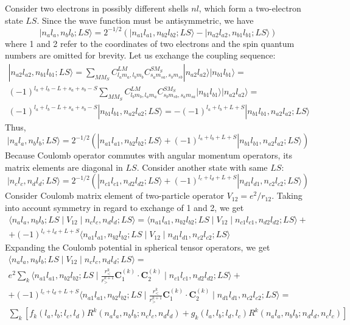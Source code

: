 \documentclass[a4paper,oneside,12pt]{extarticle}
\begin{document}
Consider two electrons in possibly different shells $nl$, which form a two-electron state $LS$. Since the wave function must be antisymmetric, we have
$$
|n_a l_a, n_b l_b; LS \rangle =
2^{-1/2} (|n_{a1}l_{a1},n_{b2}l_{b2}; LS\rangle - |n_{a2}l_{a2},n_{b1}l_{b1}; LS\rangle)
$$
where 1 and 2 refer to the coordinates of two electrons and the spin quantum numbers are omitted for brevity. Let us exchange the coupling sequence:
\begin{multline}
|n_{a2}l_{a2},n_{b1}l_{b1}; LS\rangle = \sum_{MM_S} C_{l_{a} m_{a},l_{b} m_{b}}^{LM}
C_{s_{a} m_{sa},s_{b} m_{sb}}^{SM_S} 
|n_{a2}l_{a2}\rangle |n_{b1}l_{b1}\rangle =\\
(-1)^{l_{a}+l_{b}-L+s_{a}+s_{b}-S}\sum_{MM_S} C_{l_{b} m_{b}, l_{a} m_{a}}^{LM}
C_{s_{b} m_{sb}, s_{a} m_{sa}}^{SM_S} 
|n_{b1}l_{b1}\rangle |n_{a2}l_{a2}\rangle =\\
(-1)^{l_{a}+l_{b}-L+s_{a}+s_{b}-S} |n_{b1}l_{b1},n_{a2}l_{a2}; LS\rangle = -(-1)^{l_{a}+l_{b}+L+S} |n_{b1}l_{b1},n_{a2}l_{a2}; LS\rangle
\end{multline}
Thus,
$$
|n_a l_a, n_b l_b; LS \rangle =
2^{-1/2} (|n_{a1}l_{a1},n_{b2}l_{b2}; LS\rangle + (-1)^{l_{a}+l_{b}+L+S} |n_{b1}l_{b1},n_{a2}l_{a2}; LS\rangle)
$$
Because Coulomb operator commutes with angular momentum operators, its matrix elements are diagonal in $LS$.  Consider another state with same $LS$:
$$
|n_c l_c, n_d l_d; LS \rangle =
2^{-1/2} (|n_{c1}l_{c1},n_{d2}l_{d2}; LS\rangle + (-1)^{l_{c}+l_{d}+L+S} |n_{d1}l_{d1},n_{c2}l_{c2}; LS\rangle)
$$
Consider Coulomb matrix element of two-particle operator $V_{12}=e^2/r_{12}$. Taking into account symmetry in regard to exchange of 1 and 2, we get
\begin{multline}
\langle n_a l_a, n_b l_b; LS \mid V_{12} \mid n_c l_c, n_d l_d; LS \rangle = 
\langle n_{a1}l_{a1},n_{b2}l_{b2}; LS \mid V_{12} \mid n_{c1}l_{c1},n_{d2}l_{d2}; LS \rangle +\\
+(-1)^{l_{c}+l_{d}+L+S} \langle n_{a1}l_{a1},n_{b2}l_{b2}; LS \mid V_{12} \mid n_{d1}l_{d1},n_{c2}l_{c2}; LS \rangle
\end{multline}
Expanding the Coulomb potential in spherical tensor operators, we get
\begin{multline}
\langle n_a l_a, n_b l_b; LS \mid V_{12} \mid n_c l_c, n_d l_d; LS \rangle = \\
e^2 \sum_k
\langle n_{a1}l_{a1},n_{b2}l_{b2}; LS \mid \frac{r_<^k}{r_>^{k+1}} \mathbf{C}_1^{(k)} \cdot \mathbf{C}_2^{(k)} \mid n_{c1}l_{c1},n_{d2}l_{d2}; LS \rangle +\\
+(-1)^{l_{c}+l_{d}+L+S} \langle n_{a1}l_{a1},n_{b2}l_{b2}; LS \mid \frac{r_<^k}{r_>^{k+1}} \mathbf{C}_1^{(k)} \cdot \mathbf{C}_2^{(k)}  \mid n_{d1}l_{d1},n_{c2}l_{c2}; LS \rangle =\\
\sum_k \left[ f_k(l_a, l_b; l_c, l_d) R^k(n_a l_a, n_b l_b; n_c l_c, n_d l_d) + g_k(l_a, l_b; l_d, l_c) R^k(n_a l_a, n_b l_b; n_d l_d, n_c l_c) \right]
\end{multline}
\end{document}
